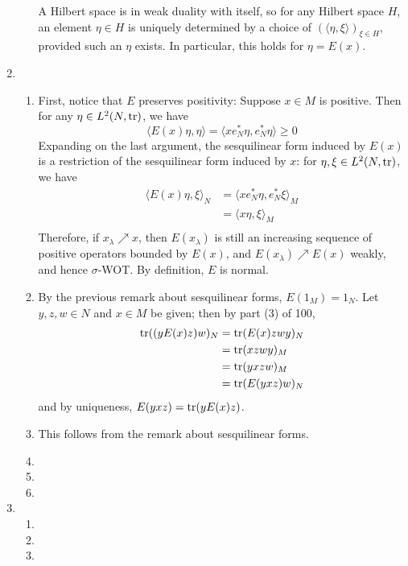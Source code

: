 \documentclass[a4paper,10pt]{report}
\newcommand{\ggen}[1]{\langle#1\rangle}
\begin{document}
\begin{enumerate}
\begin{enumerate}
				A Hilbert space is in weak duality with itself, so for any Hilbert space $H$, an element $\eta\in H$ is uniquely determined by a choice of $(\ggen{\eta,\xi})_{\xi\in H}$, provided such an $\eta$ exists. In particular, this holds for $\eta=E(x)$. 
		\end{enumerate}
	\item 
		\begin{enumerate}
			\item First, notice that $E$ preserves positivity: Suppose $x\in M$ is positive. Then for any $\eta\in L^2(N,\operatorname{tr})$, we have 
				\[\ggen{E(x)\eta,\eta}=\ggen{xe_N^*\eta,e_N^*\eta}\ge0\]
				Expanding on the last argument, the sesquilinear form induced by $E(x)$ is a restriction of the sesquilinear form induced by $x$: for $\eta,\xi\in L^2(N,\operatorname{tr})$, we have 
				\begin{align*}
					\ggen{E(x)\eta,\xi}_N &= \ggen{xe_N^*\eta,e_N^*\xi}_M\\
					&= \ggen{x\eta,\xi}_M\\
				\end{align*}
				Therefore, if $x_\lambda\nearrow x$, then $E(x_\lambda)$ is still an increasing sequence of positive operators bounded by $E(x)$, and $E(x_\lambda)\nearrow E(x)$ weakly, and hence $\sigma$-WOT. By definition, $E$ is normal. 
			\item By the previous remark about sesquilinear forms, $E(1_M)=1_N$. Let $y,z,w\in N$ and $x\in M$ be given; then by part (3) of 100, 
				\begin{align*}
					\operatorname{tr}((yE(x)z)w)_N &= \operatorname{tr}(E(x)zwy)_N\\
					&= \operatorname{tr}(xzwy)_M\\
					&= \operatorname{tr}(yxzw)_M\\
					&= \operatorname{tr}(E(yxz)w)_N
				\end{align*}
				and by uniqueness, $E(yxz)=\operatorname{tr}(yE(x)z)$. 
			\item This follows from the remark about sesquilinear forms. 
			\item 
			\item 
			\item 
		\end{enumerate}
	\item
		\begin{enumerate}
			\item 
			\item 
			\item 
		\end{enumerate}
\end{enumerate}
\end{document}
